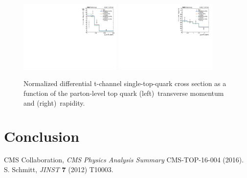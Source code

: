 \documentclass[12pt]{article}
\begin{document}
\begin{figure}[th]
\begin{center}
\includegraphics[width=0.45\textwidth]{figures/result/unfolded_top_pt.pdf}\hspace{0.05\textwidth}
\includegraphics[width=0.45\textwidth]{figures/result/unfolded_top_y.pdf}
\end{center}

\caption{Normalized differential t-channel single-top-quark cross section as a function of the parton-level top quark (left)~transverse momentum and (right)~rapidity.}
\end{figure}



\section{Conclusion}





\begin{thebibliography}{99}

 CMS Collaboration, \emph{CMS Physics Analysis Summary} CMS-TOP-16-004 (2016).
 S. Schmitt, \emph{JINST} \textbf{7} (2012) T10003.

\end{thebibliography}

 
\end{document}
